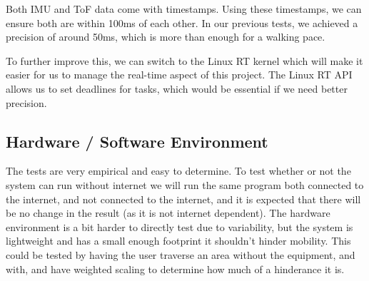 \documentclass[11pt]{article}
\begin{document}
	Both IMU and ToF data come with timestamps. Using these timestamps, we can ensure both are within 100ms of each other. In our previous tests, we achieved a precision of around 50ms, which is more than enough for a walking pace. 
	
	To further improve this, we can switch to the Linux RT kernel which will make it easier for us to manage the real-time aspect of this project. The Linux RT API allows us to set deadlines for tasks, which would be essential if we need better precision. 
	
	\subsection{Hardware / Software Environment}
	
	The tests are very empirical and easy to determine. To test whether or not the system can run without internet we will run the same program both connected to the internet, and not connected to the internet, and it is expected that there will be no change in the result (as it is not internet dependent). The hardware environment is a bit harder to directly test due to variability, but the system is lightweight and has a small enough footprint it shouldn't hinder mobility. This could be tested by having the user traverse an area without the equipment, and with, and have weighted scaling to determine how much of a hinderance it is. \\
	
\end{document}
